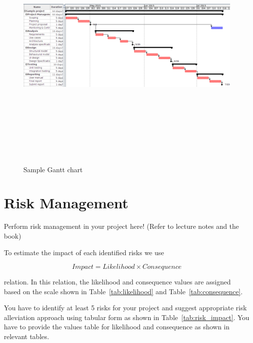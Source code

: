 \documentclass[12pt, a4paper]{report}
\begin{document}
\begin{landscape}
\begin{figure}[htb!]
  \begin{center}
    \includegraphics[width=9in, height=5in]{../img/sample_gantt.png}
  \end{center}
  \caption{Sample Gantt chart}
  \label{fig:gantt}
\end{figure}
\end{landscape}


\chapter{Risk Management} %
\label{cha:risk_management}
Perform risk management in your project here! (Refer to lecture notes and the book)

To estimate the impact of each identified risks we use

\[
  Impact = Likelihood \times Consequence
 \]

relation. In this relation, the likelihood and consequence values are assigned based on the scale shown in Table~\ref{tab:likelihood} and Table~\ref{tab:consequence}.

You have to identify at least 5 risks for your project and suggest appropriate risk alleviation approach using tabular form as shown in Table~\ref{tab:risk_impact}. You have to provide the values table for likelihood and consequence as shown in relevant tables.
\end{document}
